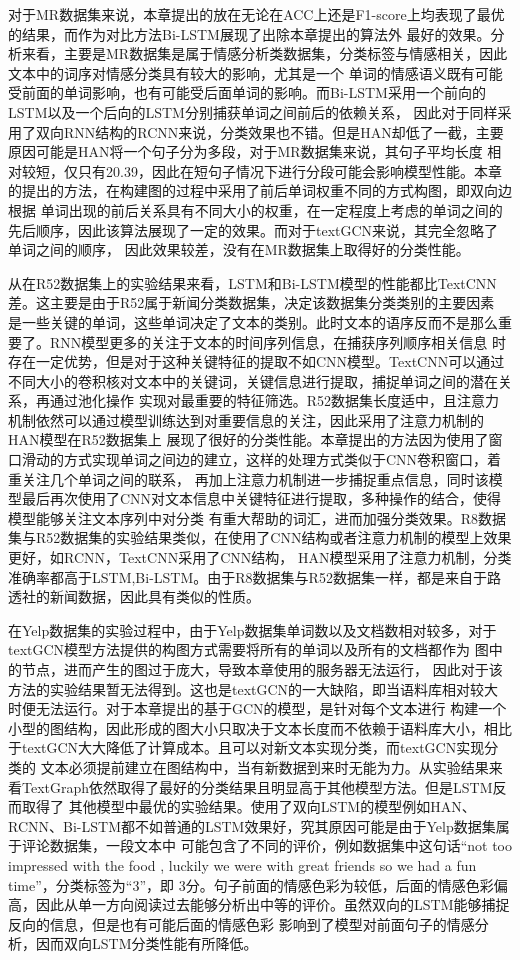 对于MR数据集来说，本章提出的放在无论在ACC上还是F1-score上均表现了最优的结果，而作为对比方法Bi-LSTM展现了出除本章提出的算法外
最好的效果。分析来看，主要是MR数据集是属于情感分析类数据集，分类标签与情感相关，因此文本中的词序对情感分类具有较大的影响，尤其是一个
单词的情感语义既有可能受前面的单词影响，也有可能受后面单词的影响。而Bi-LSTM采用一个前向的LSTM以及一个后向的LSTM分别捕获单词之间前后的依赖关系，
因此对于同样采用了双向RNN结构的RCNN来说，分类效果也不错。但是HAN却低了一截，主要原因可能是HAN将一个句子分为多段，对于MR数据集来说，其句子平均长度
相对较短，仅只有20.39，因此在短句子情况下进行分段可能会影响模型性能。本章的提出的方法，在构建图的过程中采用了前后单词权重不同的方式构图，即双向边根据
单词出现的前后关系具有不同大小的权重，在一定程度上考虑的单词之间的先后顺序，因此该算法展现了一定的效果。而对于textGCN来说，其完全忽略了单词之间的顺序，
因此效果较差，没有在MR数据集上取得好的分类性能。

从在R52数据集上的实验结果来看，LSTM和Bi-LSTM模型的性能都比TextCNN差。这主要是由于R52属于新闻分类数据集，决定该数据集分类类别的主要因素
是一些关键的单词，这些单词决定了文本的类别。此时文本的语序反而不是那么重要了。RNN模型更多的关注于文本的时间序列信息，在捕获序列顺序相关信息
时存在一定优势，但是对于这种关键特征的提取不如CNN模型。TextCNN可以通过不同大小的卷积核对文本中的关键词，关键信息进行提取，捕捉单词之间的潜在关系，再通过池化操作
实现对最重要的特征筛选。R52数据集长度适中，且注意力机制依然可以通过模型训练达到对重要信息的关注，因此采用了注意力机制的HAN模型在R52数据集上
展现了很好的分类性能。本章提出的方法因为使用了窗口滑动的方式实现单词之间边的建立，这样的处理方式类似于CNN卷积窗口，着重关注几个单词之间的联系，
再加上注意力机制进一步捕捉重点信息，同时该模型最后再次使用了CNN对文本信息中关键特征进行提取，多种操作的结合，使得模型能够关注文本序列中对分类
有重大帮助的词汇，进而加强分类效果。R8数据集与R52数据集的实验结果类似，在使用了CNN结构或者注意力机制的模型上效果更好，如RCNN，TextCNN采用了CNN结构，
HAN模型采用了注意力机制，分类准确率都高于LSTM,Bi-LSTM。由于R8数据集与R52数据集一样，都是来自于路透社的新闻数据，因此具有类似的性质。

在Yelp数据集的实验过程中，由于Yelp数据集单词数以及文档数相对较多，对于textGCN模型方法提供的构图方式需要将所有的单词以及所有的文档都作为
图中的节点，进而产生的图过于庞大，导致本章使用的服务器无法运行，
因此对于该方法的实验结果暂无法得到。这也是textGCN的一大缺陷，即当语料库相对较大时便无法运行。对于本章提出的基于GCN的模型，是针对每个文本进行
构建一个小型的图结构，因此形成的图大小只取决于文本长度而不依赖于语料库大小，相比于textGCN大大降低了计算成本。且可以对新文本实现分类，而textGCN实现分类的
文本必须提前建立在图结构中，当有新数据到来时无能为力。从实验结果来看TextGraph依然取得了最好的分类结果且明显高于其他模型方法。但是LSTM反而取得了
其他模型中最优的实验结果。使用了双向LSTM的模型例如HAN、RCNN、Bi-LSTM都不如普通的LSTM效果好，究其原因可能是由于Yelp数据集属于评论数据集，一段文本中
可能包含了不同的评价，例如数据集中这句话“not too impressed with the food , luckily we were with great friends so we had a fun time”，分类标签为“3”，即
3分。句子前面的情感色彩为较低，后面的情感色彩偏高，因此从单一方向阅读过去能够分析出中等的评价。虽然双向的LSTM能够捕捉反向的信息，但是也有可能后面的情感色彩
影响到了模型对前面句子的情感分析，因而双向LSTM分类性能有所降低。

